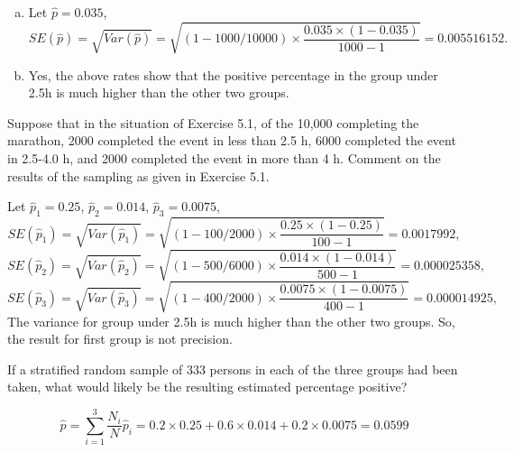 \documentclass[12pt]{article}
\begin{document}
    \begin{solution}
        \begin{enumerate}[a. ]
            \item Let $\hat{p}=0.035$, 
            \[
                SE(\hat{p})=\sqrt{Var(\hat{p})}=\sqrt{(1-1000/10000)\times\frac{0.035\times(1-0.035)}{1000-1}}=0.005516152. 
            \]
            \item Yes, the above rates show that the positive percentage in the group under 2.5h is much higher than the other two groups. 
        \end{enumerate}
    \end{solution}

    \begin{exercise}[Levy-5.2]
        Suppose that in the situation of Exercise 5.1, of the 10,000 completing the marathon, 2000 completed the event in less than 2.5 h, 6000 completed the event in 2.5-4.0 h, and 2000 completed the event in more than 4 h. Comment on the results of the sampling as given in Exercise 5.1. 
    \end{exercise}

    \begin{solution}
        Let $\hat{p}_1=0.25$, $\hat{p}_2=0.014$, $\hat{p}_3=0.0075$, 
        \[
            SE(\hat{p}_1)=\sqrt{Var(\hat{p}_1)}=\sqrt{(1-100/2000)\times\frac{0.25\times(1-0.25)}{100-1}}=0.0017992, 
        \]
        \[
            SE(\hat{p}_2)=\sqrt{Var(\hat{p}_2)}=\sqrt{(1-500/6000)\times\frac{0.014\times(1-0.014)}{500-1}}=0.000025358, 
        \]
        \[
            SE(\hat{p}_3)=\sqrt{Var(\hat{p}_3)}=\sqrt{(1-400/2000)\times\frac{0.0075\times(1-0.0075)}{400-1}}=0.000014925, 
        \]
        The variance for group under 2.5h is much higher than the other two groups. So, the result for first group is not precision. 
    \end{solution}

    \begin{exercise}[Levy-5.3]
        If a stratified random sample of 333 persons in each of the three groups had been taken, what would likely be the resulting estimated percentage positive? 
    \end{exercise}

    \begin{solution}
        \[
            \hat{p}=\sum_{i=1}^3\frac{N_i}{N}\hat{p}_i=0.2\times 0.25+0.6\times 0.014+0.2\times0.0075=0.0599
        \]
    \end{solution}
\end{document}

